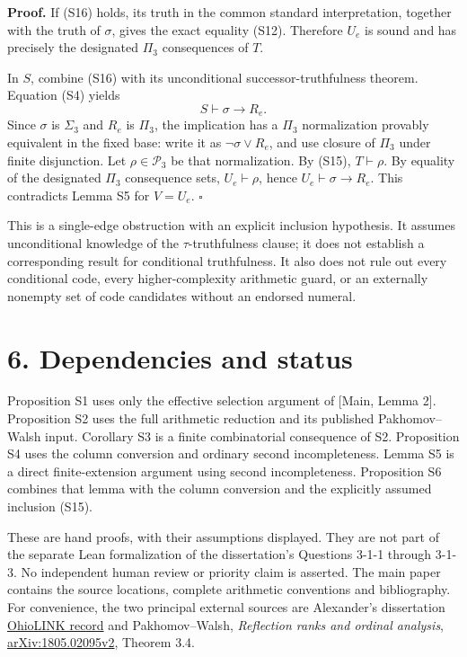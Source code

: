 \documentclass[
  11pt,
  letterpaper,
]{article}
\begin{document}
\textbf{Proof.} If (S16) holds, its truth in the common standard
interpretation, together with the truth of \(\sigma\), gives the exact
equality (S12). Therefore \(U_e\) is sound and has precisely the
designated \(\Pi_3\) consequences of \(T\).

In \(S\), combine (S16) with its unconditional successor-truthfulness
theorem. Equation (S4) yields \[
S\vdash\sigma\rightarrow R_e.
\tag{S17}
\] Since \(\sigma\) is \(\Sigma_3\) and \(R_e\) is \(\Pi_3\), the
implication has a \(\Pi_3\) normalization provably equivalent in the
fixed base: write it as \(\neg\sigma\vee R_e\), and use closure of
\(\Pi_3\) under finite disjunction. Let \(\rho\in\mathcal P_3\) be that
normalization. By (S15), \(T\vdash\rho\). By equality of the designated
\(\Pi_3\) consequence sets, \(U_e\vdash\rho\), hence
\(U_e\vdash\sigma\rightarrow R_e\). This contradicts Lemma S5 for
\(V=U_e\). \hfill\(\square\)

This is a single-edge obstruction with an explicit inclusion hypothesis.
It assumes unconditional knowledge of the \(\tau\)-truthfulness clause;
it does not establish a corresponding result for conditional
truthfulness. It also does not rule out every conditional code, every
higher-complexity arithmetic guard, or an externally nonempty set of
code candidates without an endorsed numeral.

\section{6. Dependencies and status}\label{dependencies-and-status}

Proposition S1 uses only the effective selection argument of {[}Main,
Lemma 2{]}. Proposition S2 uses the full arithmetic reduction and its
published Pakhomov--Walsh input. Corollary S3 is a finite combinatorial
consequence of S2. Proposition S4 uses the column conversion and
ordinary second incompleteness. Lemma S5 is a direct finite-extension
argument using second incompleteness. Proposition S6 combines that lemma
with the column conversion and the explicitly assumed inclusion (S15).

These are hand proofs, with their assumptions displayed. They are not
part of the separate Lean formalization of the dissertation's Questions
3-1-1 through 3-1-3. No independent human review or priority claim is
asserted. The main paper contains the source locations, complete
arithmetic conventions and bibliography. For convenience, the two
principal external sources are Alexander's dissertation
\href{https://rave.ohiolink.edu/etdc/view?acc_num=osu1366362999}{OhioLINK
record} and Pakhomov--Walsh, \emph{Reflection ranks and ordinal
analysis},
\href{https://arxiv.org/abs/1805.02095v2}{arXiv:1805.02095v2}, Theorem
3.4.
\end{document}
